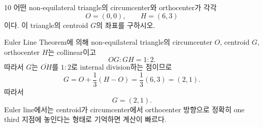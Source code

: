 \begin{problem}{10}
어떤 non-equilateral triangle의 circumcenter와 orthocenter가 각각
\[
    O=(0,0),
    \qquad
    H=(6,3)
\]
이다. 이 triangle의 centroid $G$의 좌표를 구하시오.
\end{problem}

\begin{solution}
Euler Line Theorem에 의해 non-equilateral triangle의 circumcenter $O$, centroid $G$, orthocenter $H$는 collinear이고
\[
    OG:GH=1:2.
\]
따라서 $G$는 $\overline{OH}$를 $1:2$로 internal division하는 점이므로
\[
    G
    =O+\frac13(H-O)
    =\frac13(6,3)
    =(2,1).
\]
따라서
\[
    \boxed{G=(2,1)}.
\]
Euler line에서는 centroid가 circumcenter에서 orthocenter 방향으로 정확히 one third 지점에 놓인다는 형태로 기억하면 계산이 빠르다.
\end{solution}
